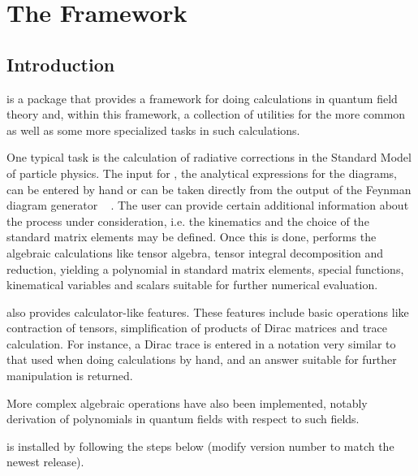 \chapter{The \fc Framework}

\section{Introduction}
\label{intro}

\fc is a \mma package that provides a framework for doing calculations
in quantum field theory and, within this framework, a collection of utilities
for the more common as well as some more specialized tasks
in such calculations.

One typical task is the calculation of
radiative corrections in the Standard Model of particle physics.
The input for \fc, the analytical expressions for the diagrams, can be
entered by hand or can be taken directly from the output of the Feynman diagram generator \fa\ \cite{feynarts} .
The user can provide certain additional  information about the process
under consideration, i.e. the kinematics and the choice of the standard
matrix elements may be defined. Once this is done, \fc performs the
algebraic calculations like tensor algebra, tensor integral decomposition and reduction,
yielding a polynomial in standard matrix elements,  special functions, kinematical
variables and scalars suitable for further numerical evaluation.

\fc also provides calculator-like features.
These features include basic operations like contraction of
tensors, simplification of products of Dirac matrices and trace calculation.
For instance, a Dirac trace is entered
in a notation very similar to that used when doing calculations by hand, and
an answer suitable for further manipulation is returned.

More complex algebraic operations have also been implemented, notably derivation
of polynomials in quantum fields with respect to such fields.

\fc is installed by following the steps below (modify version number to match
the newest release).

